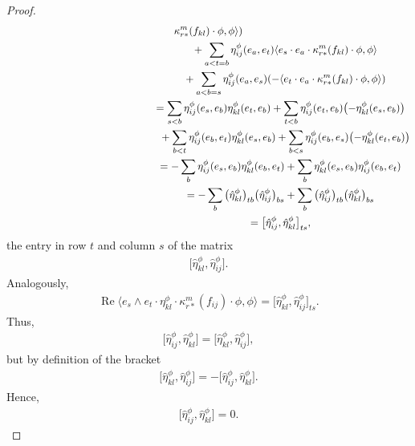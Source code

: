 \documentclass[pdftex]{sigma}
\numberwithin{equation}{section}
\begin{document}
\begin{proof}
\begin{gather*}
\kappa_{r*}^m(f_{kl})\cdot\phi,\phi\rangle )\\
\hphantom{\operatorname{Re}\big\langle e_s\wedge e_t \cdot \eta_{ij}^\phi\cdot \kappa_{r*}^m(f_{kl})\cdot\phi,\phi\big\rangle=}{}
 +\sum_{a<t=b}\eta_{ij}^\phi(e_a,e_t)\langle e_s\cdot e_a\cdot
\kappa_{r*}^m(f_{kl})\cdot\phi,\phi\rangle \\
\hphantom{\operatorname{Re}\big\langle e_s\wedge e_t \cdot \eta_{ij}^\phi\cdot \kappa_{r*}^m(f_{kl})\cdot\phi,\phi\big\rangle=}{}
 +\sum_{a<b=s}\eta_{ij}^\phi(e_a,e_s)(-\langle e_t \cdot e_a\cdot
\kappa_{r*}^m(f_{kl})\cdot\phi,\phi\rangle )\\
\hphantom{\operatorname{Re}\big\langle e_s\wedge e_t \cdot \eta_{ij}^\phi\cdot \kappa_{r*}^m(f_{kl})\cdot\phi,\phi\big\rangle}{}
= \sum_{s<b}\eta_{ij}^\phi(e_s,e_b)\eta_{kl}^\phi(e_t,e_b) +\sum_{t<b}\eta_{ij}^\phi(e_t,e_b)\big({-}\eta_{kl}^\phi(e_s,e_b)\big)\\
\hphantom{\operatorname{Re}\big\langle e_s\wedge e_t \cdot \eta_{ij}^\phi\cdot \kappa_{r*}^m(f_{kl})\cdot\phi,\phi\big\rangle=}{} +\sum_{b<t}\eta_{ij}^\phi(e_b,e_t)\eta_{kl}^\phi(e_s,e_b) +\sum_{b<s}\eta_{ij}^\phi(e_b,e_s)\big({-}\eta_{kl}^\phi(e_t,e_b)\big)\\
 \hphantom{\operatorname{Re}\big\langle e_s\wedge e_t \cdot \eta_{ij}^\phi\cdot \kappa_{r*}^m(f_{kl})\cdot\phi,\phi\big\rangle }{}
 = -\sum_{b}\eta_{ij}^\phi(e_s,e_b)\eta_{kl}^\phi(e_b,e_t)
+\sum_{b}\eta_{kl}^\phi(e_s,e_b)\eta_{ij}^\phi(e_b,e_t)\\
\hphantom{\operatorname{Re}\big\langle e_s\wedge e_t \cdot \eta_{ij}^\phi\cdot \kappa_{r*}^m(f_{kl})\cdot\phi,\phi\big\rangle}{}
= -\sum_{b}\big(\hat\eta_{kl}^\phi\big)_{tb}\big(\hat\eta_{ij}^\phi\big)_{bs}
+\sum_{b}\big(\hat\eta_{ij}^\phi\big)_{tb}\big(\hat\eta_{kl}^\phi\big)_{bs}\\
\hphantom{\operatorname{Re}\big\langle e_s\wedge e_t \cdot \eta_{ij}^\phi\cdot \kappa_{r*}^m(f_{kl})\cdot\phi,\phi\big\rangle}{}
= \big[\hat\eta_{ij}^\phi,\hat\eta_{kl}^\phi\big]_{ts},
\end{gather*}
the entry in row $t$ and column $s$ of the matrix
\begin{gather*}\big[\hat\eta_{kl}^\phi,\hat\eta_{ij}^\phi\big].\end{gather*}
Analogously,
\begin{gather*}
\operatorname{Re}\big\langle e_s\wedge e_t \cdot \eta_{kl}^\phi\cdot \kappa_{r*}^m(f_{ij})\cdot\phi,\phi\big\rangle
 = \big[\hat\eta_{kl}^\phi,\hat\eta_{ij}^\phi\big]_{ts}.
\end{gather*}
Thus,
\begin{gather*}\big[\hat\eta_{ij}^\phi,\hat\eta_{kl}^\phi\big]=\big[\hat\eta_{kl}^\phi,\hat\eta_{ij}^\phi\big],\end{gather*}
but by definition of the bracket
\begin{gather*}\big[\hat\eta_{kl}^\phi,\hat\eta_{ij}^\phi\big]=-\big[\hat\eta_{ij}^\phi,\hat\eta_{kl}^\phi\big].\end{gather*}
Hence,
\begin{gather*}\big[\hat\eta_{ij}^\phi,\hat\eta_{kl}^\phi\big]=0.\end{gather*}


\end{proof}
\end{document}
